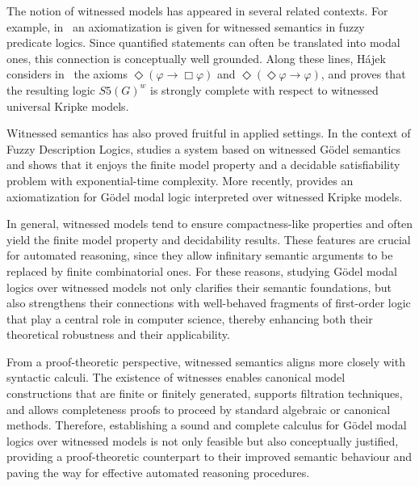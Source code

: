 The notion of witnessed models has appeared in several related
contexts. For example, in~\cite{HC2006} an axiomatization is given for
witnessed semantics in fuzzy predicate logics. Since quantified
statements can often be translated into modal ones, this connection is
conceptually well grounded. Along these lines, H\'ajek considers
in~\cite{HajekS5} the axioms $\Diamond(\varphi \to \Box \varphi)$ and
$\Diamond(\Diamond \varphi \to \varphi)$, and proves that the resulting
logic $S5(G)^w$ is strongly complete with respect to witnessed
universal Kripke models.

Witnessed semantics has also proved fruitful in applied settings. In
the context of Fuzzy Description Logics, \cite{BDP2014} studies a
system based on witnessed G\"odel semantics and shows that it enjoys
the finite model property and a decidable satisfiability problem with
exponential-time complexity. More recently, \cite{RV26} provides an
axiomatization for  G\"odel modal logic interpreted over witnessed
Kripke models.

In general, witnessed models tend to ensure compactness-like properties and
often yield the finite model property and decidability
results. These features are crucial for automated reasoning,
since they allow infinitary semantic arguments to be replaced by
finite combinatorial ones. For these reasons, studying G\"odel modal
logics over witnessed models not only clarifies their semantic
foundations, but also strengthens their connections with well-behaved
fragments of first-order logic that play a central role in computer
science, thereby enhancing both their theoretical robustness and their
applicability.

From a proof-theoretic perspective, witnessed semantics aligns more
closely with syntactic calculi.
The existence of witnesses enables canonical model constructions that
are finite or finitely generated, supports filtration techniques, and
allows completeness proofs to proceed by standard algebraic or
canonical methods. Therefore, establishing a sound and complete
calculus for G\"odel modal logics over witnessed models is not only
feasible but also conceptually justified, providing a proof-theoretic
counterpart to their improved semantic behaviour and paving the way for
effective automated reasoning procedures.



